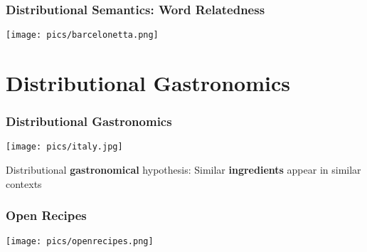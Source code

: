 \documentclass{beamer}
\begin{document}
\begin{frame}
    \frametitle{Distributional Semantics: Word Relatedness}

        \centering
        \texttt{[image: pics/barcelonetta.png]}



\end{frame}

\section{Distributional Gastronomics}

\begin{frame}
    \frametitle{Distributional Gastronomics}
    \centering\texttt{[image: pics/italy.jpg]}

    \pause
    Distributional \textbf{gastronomical} hypothesis: Similar \textbf{ingredients} appear in similar contexts
\end{frame}

\begin{frame}
    \frametitle{Open Recipes}
    \centering\texttt{[image: pics/openrecipes.png]}
\end{frame}
\end{document}
